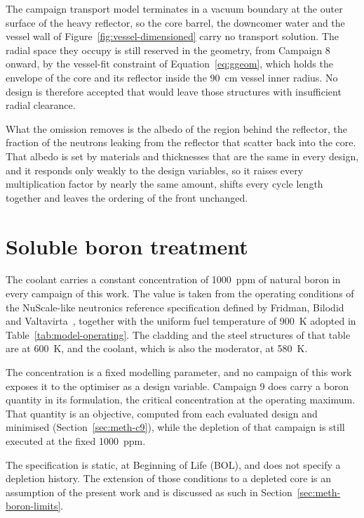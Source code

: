 The campaign transport model terminates in a vacuum boundary at the
outer surface of the heavy reflector, so the core barrel, the downcomer
water and the vessel wall of Figure~\ref{fig:vessel-dimensioned} carry
no transport solution. The radial space they occupy is still reserved
in the geometry, from Campaign 8 onward, by the vessel-fit constraint
of Equation~\eqref{eq:ggeom}, which holds the envelope of the core and
its reflector inside the \SI{90}{cm} vessel inner radius. No design is
therefore accepted that would leave those structures with insufficient
radial clearance.

What the omission removes is the albedo of the region behind the
reflector, the fraction of the neutrons leaking from the reflector that
scatter back into the core. That albedo is set by materials and
thicknesses that are the same in every design, and it responds only
weakly to the design variables, so it raises every multiplication factor by nearly
the same amount, shifts every cycle length together and leaves the
ordering of the front unchanged.

\section{Soluble boron treatment}
\label{sec:meth-boron}

The coolant carries a constant concentration of \SI{1000}{ppm} of
natural boron in every campaign of this work. The value is taken from
the operating conditions of the NuScale-like neutronics reference specification
defined by Fridman, Bilodid and
Valtavirta~\cite{fridman_nuscale_benchmark_2023}, together with the
uniform fuel temperature of \SI{900}{\kelvin} adopted in
Table~\ref{tab:model-operating}. The cladding and the steel structures
of that table are at \SI{600}{\kelvin}, and the coolant, which is also
the moderator, at \SI{580}{\kelvin}.

The concentration is a fixed modelling parameter, and no campaign of
this work exposes it to the optimiser as a design variable. Campaign 9 does carry a boron
quantity in its formulation, the critical concentration at the
operating maximum. That quantity is an objective, computed from each
evaluated design and minimised (Section~\ref{sec:meth-c9}), while the
depletion of that campaign is still executed at the fixed \SI{1000}{ppm}.

The specification is static, at Beginning of Life (BOL), and does not
specify a depletion history. The extension of those
conditions to a depleted core is an assumption of the present work and
is discussed as such in Section~\ref{sec:meth-boron-limits}.

